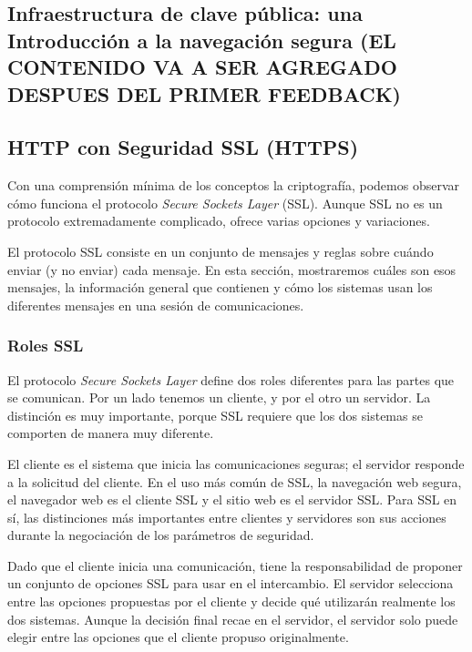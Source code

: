 \subsection{Infraestructura de clave pública: una Introducción a la navegación segura (EL CONTENIDO 
VA A SER AGREGADO DESPUES DEL PRIMER FEEDBACK) }   

%

\subsection{HTTP con Seguridad SSL (HTTPS)} 

Con una comprensión mínima de los conceptos la criptografía, podemos 
observar cómo funciona el protocolo \emph{Secure Sockets Layer} (SSL). Aunque
 SSL no es un protocolo extremadamente complicado, ofrece varias 
 opciones y variaciones.

El protocolo SSL consiste en un conjunto de mensajes y reglas sobre
 cuándo enviar (y no enviar) cada mensaje. En esta sección, mostraremos 
 cuáles son esos mensajes, la información general que contienen y 
 cómo los sistemas usan los diferentes mensajes en una sesión de
  comunicaciones.


\subsubsection*{Roles SSL}
El protocolo \emph{Secure Sockets Layer} define dos roles diferentes para las
partes que se comunican. Por un lado tenemos un cliente, y por el otro
un servidor. La distinción es muy importante, porque SSL requiere que 
los dos sistemas se comporten de manera muy diferente. 

El cliente es el sistema que inicia las comunicaciones seguras; el 
servidor responde a la solicitud del cliente. En el uso más común 
de SSL, la navegación web segura, el navegador web es el cliente SSL 
y el sitio web es el servidor SSL. Para SSL en sí, las distinciones 
más importantes entre clientes y servidores son sus acciones durante 
la negociación de los parámetros de seguridad.

Dado que el cliente inicia una comunicación, tiene la responsabilidad 
de proponer un conjunto de opciones SSL para usar en el intercambio. 
El servidor selecciona entre las opciones propuestas por el cliente 
y decide qué utilizarán realmente los dos sistemas. Aunque la decisión 
final recae en el servidor, el servidor solo puede elegir entre las 
opciones que el cliente propuso originalmente.


